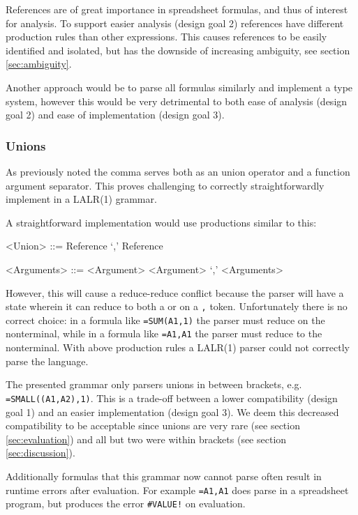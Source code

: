 \documentclass[conference]{IEEEtran}
\begin{document}
References are of great importance in spreadsheet formulas, and thus of interest for analysis.
To support easier analysis (design goal 2) references have different production rules than other expressions.
This causes references to be easily identified and isolated, but has the downside of increasing ambiguity, see section \ref{sec:ambiguity}. 

Another approach would be to parse all formulas similarly and implement a type system, however this would be very detrimental to both ease of analysis (design goal 2) and ease of implementation (design goal 3).

\subsubsection{\textbf{Unions}}
\label{subsec:desing:unions}

As previously noted the comma serves both as an union operator and a function argument separator.
This proves challenging to correctly straightforwardly implement in a LALR(1) grammar.

A straightforward implementation would use productions similar to this:

\begin{grammar}
<Union> ::= Reference `,' Reference

<Arguments> ::= <Argument>
	\alt <Argument> `,' <Arguments>
\end{grammar}

However, this will cause a reduce-reduce conflict because the parser will have a state wherein it can reduce to both a  or  on a \texttt{,} token.
Unfortunately there is no correct choice: in a formula like \texttt{=SUM(A1,1)} the parser must reduce on the  nonterminal, while in a formula like \texttt{=A1,A1} the parser must reduce to the  nonterminal.
With above production rules a LALR(1) parser could not correctly parse the language.

The presented grammar only parsers unions in between brackets, e.g. \texttt{=SMALL((A1,A2),1)}.
This is a trade-off between a lower compatibility (design goal 1) and an easier implementation (design goal 3).
We deem this decreased compatibility to be acceptable since unions are very rare (see section \ref{sec:evaluation}) and all but two were within brackets (see section \ref{sec:discussion}).

Additionally formulas that this grammar now cannot parse often result in runtime errors after evaluation.
For example \texttt{=A1,A1} does parse in a spreadsheet program, but produces the error \texttt{\#VALUE!} on evaluation.
\end{document}
